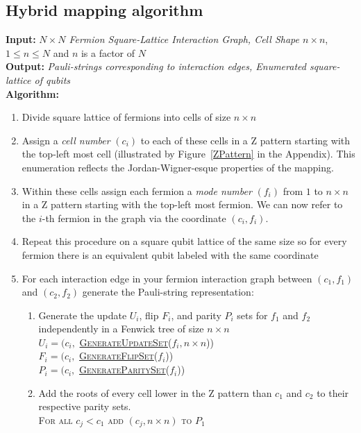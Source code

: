 \documentclass[pdftex,pra,aps,twocolumn,twoside]{revtex4-1}
\theoremstyle{plain}
\theoremstyle{note}
\newcommand\+{{\footnotesize \raisebox{0.3ex}{+}}}
\begin{document}
\subsection{Hybrid mapping algorithm}
\label{section:Hybridmapping}
\noindent
\textbf{Input:} \textit{$N\times N$ Fermion Square-Lattice Interaction Graph, Cell Shape $n \times n$}, $1\le n\le N$ and $n$ is a factor of $N$\\
\textbf{Output:} \textit{Pauli-strings corresponding to interaction edges, Enumerated square-lattice of qubits}\\
\textbf{Algorithm:}
\begin{enumerate}
    \item Divide square lattice of fermions into cells of size $n \times n$
    \item Assign a \textit{cell number} $(c_i)$ to each of these cells in a Z pattern starting with the top-left most cell (illustrated by Figure~\ref{ZPattern} in the Appendix). 
    This enumeration reflects the Jordan-Wigner-esque properties of the mapping.
    \item Within these cells assign each fermion a \textit{mode number} $(f_i)$ from $1$ to $n\times n$ in a Z pattern starting with the top-left most fermion. We can now refer to the $i$-th fermion in the graph via the coordinate $(c_i, f_i)$.
    \item Repeat this procedure on a square qubit lattice of the same size so for every fermion there is an equivalent qubit labeled with the same coordinate
    \item For each interaction edge in your fermion interaction graph between $(c_1, f_1)$ and $(c_2, f_2)$ generate the Pauli-string representation:
    \begin{enumerate}
        \item Generate the update $U_i$, flip $F_i$, and parity $P_i$ sets for $f_1$ and $f_2$ independently in a Fenwick tree of size $n \times n$\\
        \textsc{$U_i = (c_i, $ \hyperref[GenerateUpdateSet]{GenerateUpdateSet}($f_i, n\times n$))}\\
        \textsc{$F_i = (c_i, $ \hyperref[GenerateFlipSet]{GenerateFlipSet}($f_i$))}\\
        \textsc{$P_i = (c_i, $ \hyperref[GenerateParitySet]{GenerateParitySet}($f_i$))}
        \item Add the roots of every cell lower in the Z pattern than $c_1$ and $c_2$ to their respective parity sets. \\
        \textsc{For all $c_j < c_1$ add $(c_j, n \times n)$ to $P_1$}\\

\end{enumerate}
\end{enumerate}
\end{document}
